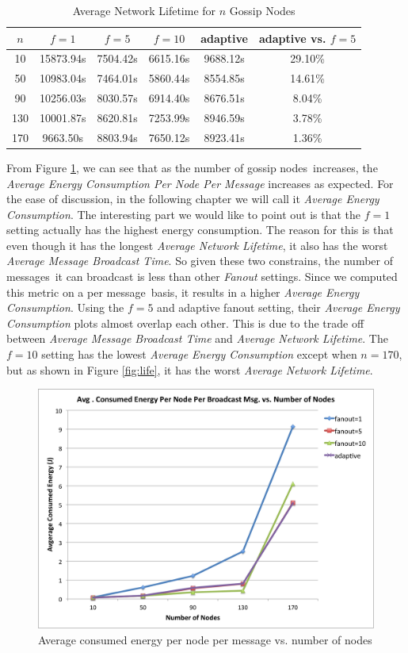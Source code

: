 \documentclass[onehalf,11pt]{beavtex}
\newcommand{\msgs}{messages}
\newcommand{\msg}{message}
\newcommand{\gns}{gossip nodes}
\newcommand{\ambt}{Average Message Broadcast Time}
\newcommand{\anl}{Average Network Lifetime}
\newcommand{\aec}{Average Energy Consumption}
\begin{document}
\begin{table}[h]
	\centering
	\caption{Average Network Lifetime for $n$ Gossip Nodes}
	\label{table:life}
	\begin{tabular}{|c|c|c|c|c|c|}
		\hline 
		$n$ & $f=1$ & $f=5$ & $f=10$ & adaptive & adaptive vs. $f=5$ \\ 
		\hline 
		10 & 15873.94s & 7504.42s & 6615.16s & 9688.12s & 29.10\% \\ 
		\hline 
		50 & 10983.04s & 7464.01s & 5860.44s & 8554.85s & 14.61\% \\ 
		\hline 
		90 & 10256.03s & 8030.57s & 6914.40s & 8676.51s & 8.04\% \\ 
		\hline 
		130 & 10001.87s & 8620.81s & 7253.99s & 8946.59s & 3.78\% \\ 
		\hline 
		170 & 9663.50s & 8803.94s & 7650.12s & 8923.41s & 1.36\% \\ 
		\hline 
	\end{tabular} 
\end{table}

From Figure \ref{fig:energy}, we can see that as the number of \gns ~increases, the \emph{Average Energy Consumption Per Node Per Message} increases as expected. For the ease of discussion, in the following chapter we will call it \emph{Average Energy Consumption}. The interesting part we would like to point out is that the $f=1$ setting actually has the highest energy consumption. The reason for this is that even though it has the longest \emph{\anl}, it also has the worst \emph{\ambt}. So given these two constrains, the number of \msgs ~it can broadcast is less than other \emph{Fanout} settings. Since we computed this metric on a per \msg ~basis, it results in a higher \emph{\aec}. Using the $f=5$ and adaptive fanout setting, their \emph{\aec} plots almost overlap each other. This is due to the trade off between \emph{\ambt} and \emph{\anl}. The $f=10$ setting has the lowest \emph{\aec} except when $n=170$, but as shown in Figure \ref{fig:life}, it has the worst \emph{\anl}. 

\begin{figure} 
	\centering
	\includegraphics[width=5.5in]{energy.png}
	\caption{Average consumed energy per node per message vs. number of nodes}
	\label{fig:energy}
\end{figure}
\end{document}
